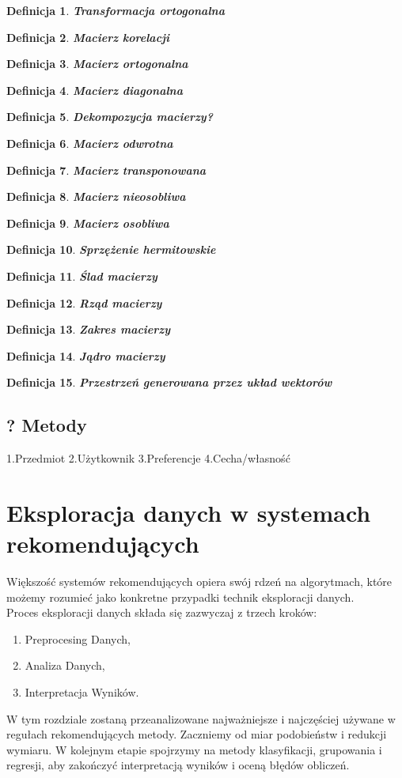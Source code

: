 \documentclass[12pt,a4paper]{report}
\newtheorem{df}{Definicja}
\begin{document}
\begin{df}\textbf{Transformacja ortogonalna}
\end{df}
\begin{df}\textbf{Macierz korelacji}
\end{df}
\begin{df}\textbf{Macierz ortogonalna}
\end{df}
\begin{df}\textbf{Macierz diagonalna}
\end{df}
\begin{df}\textbf{Dekompozycja macierzy?}
\end{df}
\begin{df}\textbf{Macierz odwrotna}
\end{df}
\begin{df}\textbf{Macierz transponowana}
\end{df}
\begin{df}\textbf{Macierz nieosobliwa}
\end{df}
\begin{df}\textbf{Macierz osobliwa}
\end{df}
\begin{df}\textbf{Sprzężenie hermitowskie}
\end{df}
\begin{df}\textbf{Ślad macierzy}
\end{df}
\begin{df}\textbf{Rząd macierzy}
\end{df}
\begin{df}\textbf{Zakres macierzy}
\end{df}
\begin{df}\textbf{Jądro macierzy}
\end{df}
\begin{df}\textbf{Przestrzeń generowana przez układ wektorów}
\end{df}
\section{? Metody}
1.Przedmiot 2.Użytkownik 3.Preferencje 4.Cecha/własność

\chapter{Eksploracja danych w systemach rekomendujących}
Większość systemów rekomendujących opiera swój rdzeń na algorytmach, które możemy rozumieć jako konkretne przypadki technik eksploracji danych. 
\\Proces eksploracji danych składa się zazwyczaj z trzech kroków:
\begin{enumerate}
\item Preprocesing Danych,
\item Analiza Danych,
\item Interpretacja Wyników.
\end{enumerate}
W tym rozdziale zostaną przeanalizowane najważniejsze i najczęściej używane w regułach rekomendujących metody. Zaczniemy od miar podobieństw i redukcji wymiaru. W kolejnym etapie spojrzymy na metody klasyfikacji, grupowania i regresji, aby zakończyć interpretacją wyników i oceną błędów obliczeń.
\end{document}

